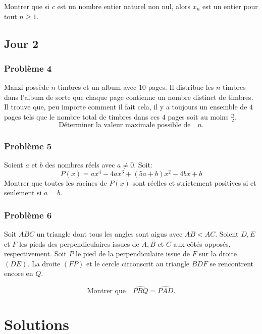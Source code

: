 \documentclass[12pt,a4paper,article]{memoir}
\begin{document}
Montrer que si $c$ est un nombre entier naturel non nul, alors $x_{n}$ est un entier pour tout $n \geq 1$.

\section{Jour 2}
\subsection{Problème 4}
Manzi possède $n$ timbres et un album avec $10$ pages. Il distribue les $n$ timbres dans l'album de sorte que chaque page contienne un nombre distinct de timbres. Il trouve que, peu importe comment il fait cela, il y a toujours un ensemble de $4$ pages tels que le nombre total de timbres dans ces $4$ pages soit au moins $\frac{n}{2}$.
\begin{equation}
\textrm{Déterminer la valeur maximale possible de} \quad n.
\label{question-pb-4}
\end{equation}

\subsection{Problème 5}
Soient $a$ et $b$ des nombres réels avec $a \neq 0$. Soit:
\begin{equation}
P(x) = ax^4 - 4ax^3 + (5a + b)x^2 - 4bx + b
\label{equation-pb-5}
\end{equation}
Montrer que toutes les racines de $P(x)$ sont réelles et strictement positives si et seulement si $a=b$.

\subsection{Problème 6}
Soit $ABC$ un triangle dont tous les angles sont aigus avec $AB < AC$. Soient $D, E$ et $F$ les pieds des perpendiculaires issues de $A, B$ et $C$ aux côtés opposés, respectivement. Soit $P$ le pied de la perpendiculaire issue de $F$ sur la droite $(DE)$. La droite $(FP)$ et le cercle circonscrit au triangle $BDF$ se rencontrent encore en $Q$.

\begin{equation}
\textrm{Montrer que} \quad \widehat{PBQ} = \widehat{PAD}.
\label{question-pb-6}
\end{equation}

\chapter{Solutions}
\end{document}
